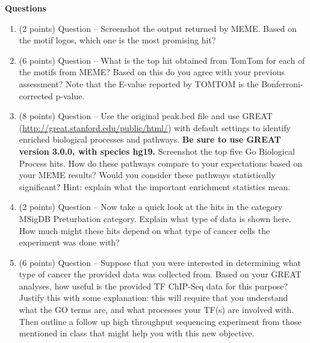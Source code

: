 \textbf{Questions}
\begin{enumerate}

\item (2 points) Question -- Screenshot the output returned by MEME.  Based on the motif logos, which one is the most promising hit?


\begin{solution}
\end{solution}


\item (6 points) Question -- What is the top hit obtained from TomTom for each of the motifs from MEME? Based on this do you agree with your previous assessment? Note that the E-value reported by TOMTOM is the Bonferroni-corrected p-value.


\begin{solution}
\end{solution}


\item (8 points) Question -- Use the original peak.bed file and use GREAT (\url{http://great.stanford.edu/public/html/}) with default settings to identify enriched biological processes and pathways. \textbf{Be sure to use GREAT version 3.0.0, with species hg19.} Screenshot the top five Go Biological Process hits. How do these pathways compare to your expectations based on your MEME results? Would you consider these pathways statistically significant? Hint: explain what the important enrichment statistics mean.
 
 
\begin{solution}
\end{solution}


\item (2 points) Question -- Now take a quick look at the hits in the category MSigDB Preturbation category. Explain what type of data is shown here. How much might these hits depend on what type of cancer cells the experiment was done with?

\begin{solution}
\end{solution}

\item (6 points) Question -- Suppose that you were interested in determining what type of cancer the provided data was collected from.  Based on your GREAT analyses, how useful is the provided TF ChIP-Seq data for this purpose? Justify this with some explanation: this will require that you understand what the GO terms are, and what processes your TF(s) are involved with. Then outline a follow up high throughput sequencing experiment from those mentioned in class that might help you with this new objective. 

\begin{solution}
\end{solution}

\end{enumerate}
